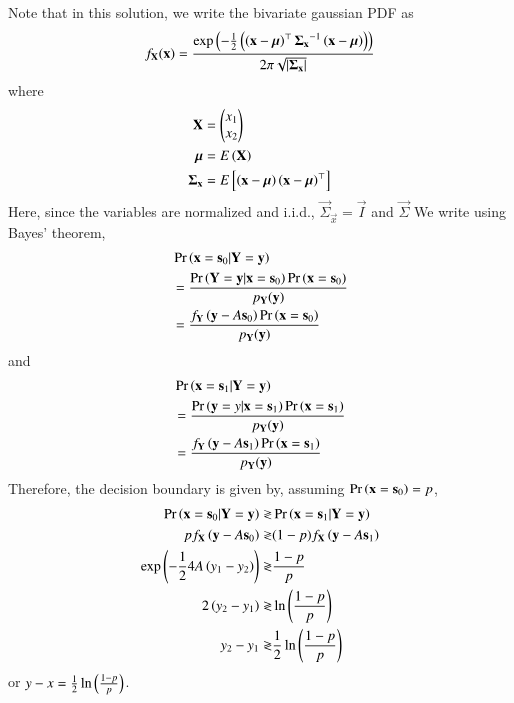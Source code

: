 \documentclass[journal,12pt,twocolumn]{IEEEtran}
\renewcommand\thesection{\arabic{section}}
\begin{document}
\begin{enumerate}[label=\thesection.\arabic*
,ref=\thesection.\theenumi]
\solution
Note that in this solution, we write the bivariate gaussian PDF as
\begin{align}
	f_{\mathbf{X}}(\mathbf{x}) = \frac{\exp{\ensuremath{\left(-\frac{1}{2}\left(\left(\mathbf{x}-\boldsymbol{\mu}\right)^\top\mathbf{\Sigma_{x}}^{-1}\left(\mathbf{x}-\boldsymbol{\mu}\right)\right)\right)}}}{2\pi\sqrt{\left\vert\mathbf{\Sigma_{x}}\right\vert}}
\end{align}
where
\begin{align}
	\mathbf{X} &= \begin{pmatrix}x_1\\x_2\end{pmatrix}\\
	\boldsymbol{\mu} &= E\left(\mathbf{X}\right) \\
	\mathbf{\Sigma_{x}} &= E{}\left[\left(\mathbf{x}-\boldsymbol{\mu}\right)\left( \mathbf{x}-\boldsymbol{\mu}\right)^{\top}\right]
\end{align}
Here, since the variables are normalized and i.i.d., $\vec{\Sigma}_{\vec{x}} = \vec{I}$ and $\vec{\Sigma}$
We write using Bayes' theorem,
\begin{align}
	&\Pr\left(\mathbf{x} = \mathbf{s}_0 | \mathbf{Y} = \mathbf{y}\right) \nonumber \\
	&= \frac{\Pr\left(\mathbf{Y} = \mathbf{y} | \mathbf{x} = \mathbf{s}_0\right)\Pr\left(\mathbf{x} = \mathbf{s}_0\right)}{p_{\mathbf{Y}}(\mathbf{y})} \\
	&= \frac{f_{\mathbf{Y}}\left(\mathbf{y} - A\mathbf{s}_0\right)\Pr\left(\mathbf{x} = \mathbf{s}_0\right)}{p_\mathbf{Y}(\mathbf{y})}
\end{align}
and
\begin{align}
	&\Pr\left(\mathbf{x} = \mathbf{s}_1 | \mathbf{Y} = \mathbf{y}\right) \nonumber\\
	&= \frac{\Pr\left(\mathbf{y} = y | \mathbf{x} = \mathbf{s}_1\right)\Pr\left(\mathbf{x} = \mathbf{s}_1\right)}{p_{\mathbf{Y}}(\mathbf{y})} \\
	&= \frac{f_{\mathbf{Y}}\left(\mathbf{y} - A\mathbf{s}_1\right)\Pr\left(\mathbf{x} = \mathbf{s}_1\right)}{p_\mathbf{Y}(\mathbf{y})}
\end{align}
Therefore, the decision boundary is given by, assuming $\Pr\left(\mathbf{x} = \mathbf{s}_0\right) = p$,
\begin{align}
	\Pr\left(\mathbf{x} = \mathbf{s}_0 | \mathbf{Y} = \mathbf{y}\right) \gtrless& \Pr\left(\mathbf{x} = \mathbf{s}_1 | \mathbf{Y} = \mathbf{y}\right) \\
	pf_{\mathbf{X}}\left(\mathbf{y} - A\mathbf{s}_0\right) \gtrless& (1 - p)f_{\mathbf{X}}\left(\mathbf{y} - A\mathbf{s}_1\right) \\
	\exp{\ensuremath{\left(-\frac{1}{2}4A\left(y_1 - y_2\right)\right)}} \gtrless& \frac{1 - p}{p} \\
	2\left(y_2 - y_1\right) \gtrless& \ln{\ensuremath{\left(\frac{1 - p}{p}\right)}} \\
	y_2 - y_1 \gtrless& \frac{1}{2}\ln{\ensuremath{\left(\frac{1 - p}{p}\right)}}
\end{align}
or $y - x = \frac{1}{2}\ln{\ensuremath{\left(\frac{1 - p}{p}\right)}}$.

\end{enumerate}
\end{document}
